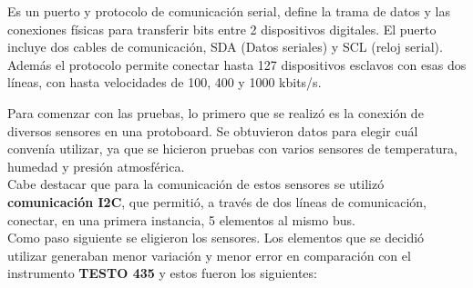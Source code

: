 
\begin{tcolorbox}[colback=blue!5!white,colframe=blue!75!black,title=I2C]
	Es un puerto y protocolo de comunicación serial, define la trama de datos y las conexiones físicas para transferir bits entre 2 dispositivos digitales. El puerto incluye dos cables de comunicación, SDA (Datos seriales) y SCL (reloj serial). Además el protocolo permite conectar hasta 127 dispositivos esclavos con esas dos líneas, con hasta velocidades de 100, 400 y 1000 kbits/s. \end{tcolorbox}
Para comenzar con las pruebas, lo primero que se realizó es la conexión de diversos sensores en una protoboard. Se obtuvieron datos para elegir cuál  convenía utilizar, ya que se hicieron pruebas con varios sensores de temperatura, humedad y presión atmosférica. \\
Cabe destacar que para la comunicación de estos sensores se utilizó \textbf{comunicación I2C}, que permitió, a través de dos líneas de comunicación, conectar, en una primera instancia,  5 elementos al mismo bus.\\
Como paso siguiente se eligieron los sensores. Los elementos que se decidió utilizar generaban menor variación y menor error en comparación con el instrumento \textbf{TESTO 435} y estos fueron los siguientes:

